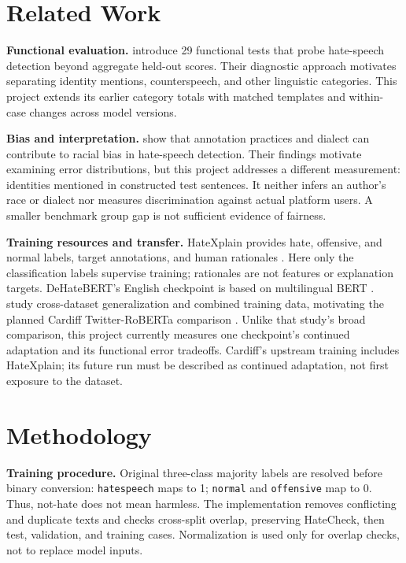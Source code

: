 \documentclass[11pt]{article}
\begin{document}
\section{Related Work}
\textbf{Functional evaluation.} \citet{rottger2021hatecheck} introduce 29 functional tests that probe hate-speech detection beyond aggregate held-out scores. Their diagnostic approach motivates separating identity mentions, counterspeech, and other linguistic categories. This project extends its earlier category totals with matched templates and within-case changes across model versions.

\textbf{Bias and interpretation.} \citet{sap2019risk} show that annotation practices and dialect can contribute to racial bias in hate-speech detection. Their findings motivate examining error distributions, but this project addresses a different measurement: identities mentioned in constructed test sentences. It neither infers an author's race or dialect nor measures discrimination against actual platform users. A smaller benchmark group gap is not sufficient evidence of fairness.

\textbf{Training resources and transfer.} HateXplain provides hate, offensive, and normal labels, target annotations, and human rationales \citep{mathew2021hatexplain}. Here only the classification labels supervise training; rationales are not features or explanation targets. DeHateBERT's English checkpoint is based on multilingual BERT \citep{aluru2020deep,hatealertcard}. \citet{antypas2023robust} study cross-dataset generalization and combined training data, motivating the planned Cardiff Twitter-RoBERTa comparison \citep{cardiffcard}. Unlike that study's broad comparison, this project currently measures one checkpoint's continued adaptation and its functional error tradeoffs. Cardiff's upstream training includes HateXplain; its future run must be described as continued adaptation, not first exposure to the dataset.

\section{Methodology}
\textbf{Training procedure.} Original three-class majority labels are resolved before binary conversion: \texttt{hatespeech} maps to 1; \texttt{normal} and \texttt{offensive} map to 0. Thus, not-hate does not mean harmless. The implementation removes conflicting and duplicate texts and checks cross-split overlap, preserving HateCheck, then test, validation, and training cases. Normalization is used only for overlap checks, not to replace model inputs.
\end{document}
